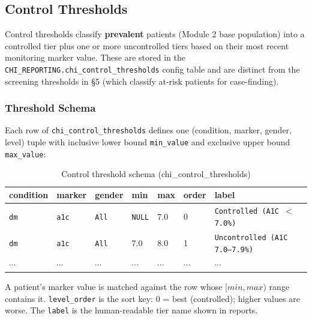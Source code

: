 \documentclass[11pt,a4paper]{article}
\begin{document}
\subsection{Control Thresholds}

Control thresholds classify \textbf{prevalent} patients (Module 2 base population) into a controlled tier plus one or more uncontrolled tiers based on their most recent monitoring marker value. These are stored in the \texttt{CHI\_REPORTING.chi\_control\_thresholds} config table and are distinct from the screening thresholds in §5 (which classify at-risk patients for case-finding).

\subsubsection{Threshold Schema}

Each row of \texttt{chi\_control\_thresholds} defines one (condition, marker, gender, level) tuple with inclusive lower bound \texttt{min\_value} and exclusive upper bound \texttt{max\_value}:

\begin{table}[ht]
\centering\small
\caption{Control threshold schema (chi\_control\_thresholds)}
\begin{tabular}{@{}p{} p{} p{} p{} p{} p{} p{}@{}}
\toprule
\textbf{condition} & \textbf{marker} & \textbf{gender} & \textbf{min} & \textbf{max} & \textbf{order} & \textbf{label} \\
\midrule
\texttt{dm}  & \texttt{a1c}  & \texttt{All}    & \texttt{NULL} & 7.0  & 0 & \texttt{Controlled (A1C $<$ 7.0\%)} \\
\texttt{dm}  & \texttt{a1c}  & \texttt{All}    & 7.0  & 8.0  & 1 & \texttt{Uncontrolled (A1C 7.0--7.9\%)} \\
$\cdots$ & $\cdots$ & $\cdots$ & $\cdots$ & $\cdots$ & $\cdots$ & $\cdots$ \\
\bottomrule
\end{tabular}
\end{table}

A patient's marker value is matched against the row whose $[min, max)$ range contains it. \texttt{level\_order} is the sort key: 0 = best (controlled); higher values are worse. The \texttt{label} is the human-readable tier name shown in reports.
\end{document}
